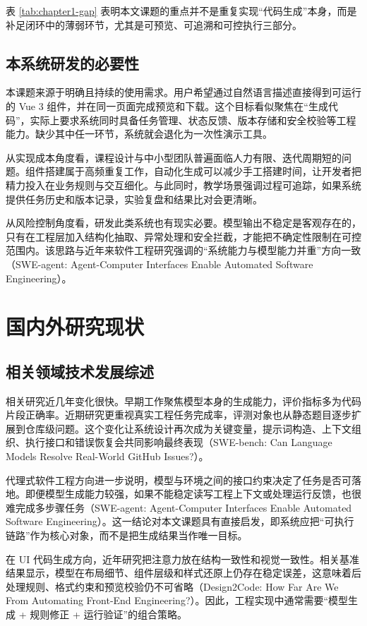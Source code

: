 表 \ref{tab:chapter1-gap} 表明本文课题的重点并不是重复实现“代码生成”本身，而是补足闭环中的薄弱环节，尤其是可预览、可追溯和可控执行三部分。

\subsection{本系统研发的必要性}
本课题来源于明确且持续的使用需求。用户希望通过自然语言描述直接得到可运行的 Vue 3 组件，并在同一页面完成预览和下载。这个目标看似聚焦在“生成代码”，实际上要求系统同时具备任务管理、状态反馈、版本存储和安全校验等工程能力。缺少其中任一环节，系统就会退化为一次性演示工具。

从实现成本角度看，课程设计与中小型团队普遍面临人力有限、迭代周期短的问题。组件搭建属于高频重复工作，自动化生成可以减少手工搭建时间，让开发者把精力投入在业务规则与交互细化。与此同时，教学场景强调过程可追踪，如果系统提供任务历史和版本记录，实验复盘和结果比对会更清晰。

从风险控制角度看，研发此类系统也有现实必要。模型输出不稳定是客观存在的，只有在工程层加入结构化抽取、异常处理和安全拦截，才能把不确定性限制在可控范围内。该思路与近年来软件工程研究强调的“系统能力与模型能力并重”方向一致（SWE-agent: Agent-Computer Interfaces Enable Automated Software Engineering）\cite{yang2024sweagent}。

\section{国内外研究现状}
\subsection{相关领域技术发展综述}
相关研究近几年变化很快。早期工作聚焦模型本身的生成能力，评价指标多为代码片段正确率。近期研究更重视真实工程任务完成率，评测对象也从静态题目逐步扩展到仓库级问题。这个变化让系统设计再次成为关键变量，提示词构造、上下文组织、执行接口和错误恢复会共同影响最终表现（SWE-bench: Can Language Models Resolve Real-World GitHub Issues?）\cite{jimenez2024swebench}。

代理式软件工程方向进一步说明，模型与环境之间的接口约束决定了任务是否可落地。即便模型生成能力较强，如果不能稳定读写工程上下文或处理运行反馈，也很难完成多步骤任务（SWE-agent: Agent-Computer Interfaces Enable Automated Software Engineering）\cite{yang2024sweagent}。这一结论对本文课题具有直接启发，即系统应把“可执行链路”作为核心对象，而不是把生成结果当作唯一目标。

在 UI 代码生成方向，近年研究把注意力放在结构一致性和视觉一致性。相关基准结果显示，模型在布局细节、组件层级和样式还原上仍存在稳定误差，这意味着后处理规则、格式约束和预览校验仍不可省略（Design2Code: How Far Are We From Automating Front-End Engineering?）\cite{si2024design2code}。因此，工程实现中通常需要“模型生成 + 规则修正 + 运行验证”的组合策略。

